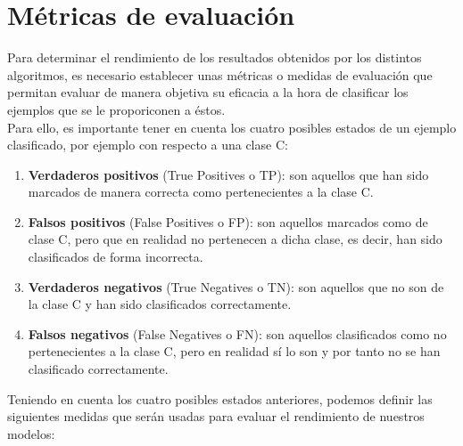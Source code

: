 \documentclass[a4paper,12pt]{report}
\begin{document}
\section{Métricas de evaluación}

{\setlength{\parindent}{0cm}
Para determinar el rendimiento de los resultados obtenidos por los distintos algoritmos, es necesario establecer unas métricas o medidas de evaluación que permitan evaluar de manera objetiva su eficacia a la hora de clasificar los ejemplos que se le proporiconen a éstos.}
\vspace{4mm}\\
Para ello, es importante tener en cuenta los cuatro posibles estados de un ejemplo clasificado, por ejemplo con respecto a una clase C:

\begin{enumerate}
\item \textbf{Verdaderos positivos} (True Positives o TP): son aquellos que han sido marcados de manera correcta como pertenecientes a la clase C.

\item \textbf{Falsos positivos} (False Positives o FP): son aquellos marcados como de clase C, pero que en realidad no pertenecen a dicha clase, es decir, han sido clasificados de forma incorrecta.

\item \textbf{Verdaderos negativos} (True Negatives o TN): son aquellos que no son de la clase C y han sido clasificados correctamente.

\item \textbf{Falsos negativos} (False Negatives o FN): son aquellos clasificados como no pertenecientes a la clase C, pero en realidad sí lo son y por tanto no se han clasificado correctamente.

\end{enumerate}

\vspace{6mm}
{\setlength{\parindent}{0cm}
Teniendo en cuenta los cuatro posibles estados anteriores, podemos definir las siguientes medidas que serán usadas para evaluar el rendimiento de nuestros modelos:}
\end{document}
